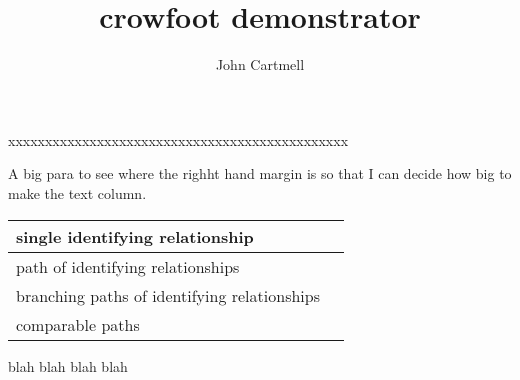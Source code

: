 \documentclass[10pt,a4paper]{article}
\title{crowfoot demonstrator}
\author{John Cartmell}
\newcommand{\handCraftedImagesFolder}{handCraftedImages}
\begin{document}
\maketitle



\newcommand{\thumbnailscale}{0.4}
xxxxxxxxxxxxxxxxxxxxxxxxxxxxxxxxxxxxxxxxxxxxxx

A big para to see where the righht hand margin is so that I can decide how big to make the text column.\\
\begin{tabular}{| p{5.5cm} | l |}
\hline
single identifying relationship &
\raisebox{-0.35cm}{\scalebox{\thumbnailscale}{
}
} \\
\hline
path of identifying relationships &
\raisebox{-0.35cm}{\scalebox{\thumbnailscale}{
}
} \\
\hline
branching paths of identifying relationships &
\raisebox{-0.85cm}{\scalebox{\thumbnailscale}{
}
} \\
\hline
comparable paths &
\raisebox{-0.65cm}{\scalebox{\thumbnailscale}{
}
} \\
\hline
\end{tabular}

blah blah blah blah\\
\end{document}
